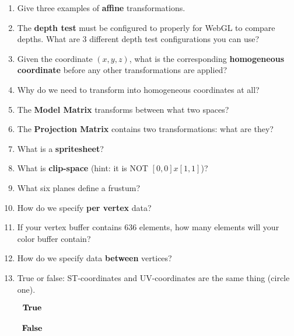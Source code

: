 \documentclass[11pt]{article}
\begin{document}
\begin{enumerate}[start=0]
\item Give three examples of \textbf{affine} transformations.
\vspace*{25px}

\item The \textbf{depth test} must be configured to properly for WebGL to compare depths. What are 3 different depth test configurations you can use?
\vspace*{25px}

\item Given the coordinate $(x, y, z)$, what is the corresponding \textbf{homogeneous coordinate} before any other transformations are applied?
\vspace*{25px}

\item Why do we need to transform into homogeneous coordinates at all?
\vspace*{25px}

\item The \textbf{Model Matrix} transforms between what two spaces?
\vspace*{25px}

\item The \textbf{Projection Matrix} contains two transformations: what are they?
\vspace*{25px}

\item What is a \textbf{spritesheet}?
\vspace*{35px}

\item What is \textbf{clip-space} (hint: it is NOT $[0, 0]x[1,1]$)?
\vspace*{25px}

\item What six planes define a frustum?
\vspace*{25px}

\item How do we specify \textbf{per vertex} data?
\vspace*{25px}

\item If your vertex buffer contains 636 elements, how many elements will your color buffer contain?
\vspace*{25px}

\item How do we specify data \textbf{between} vertices?
\vspace*{25px}

\item True or false: ST-coordinates and UV-coordinates are the same thing (circle one).
\begin{center}
$%
\begin{array}{ccccc}
\textbf{True}
\\
\vspace*{1px}
\\
\textbf{False}
\\
\vspace*{1px}
\\
\end{array}%
$
\end{center}


\end{enumerate}
\end{document}
